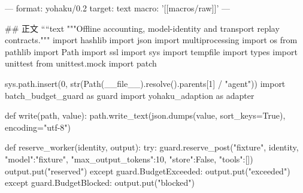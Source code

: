 ---
format: yohaku/0.2
target: text
macro: '[[macros/raw]]'
---

## 正文
````text
"""Offline accounting, model-identity and transport replay contracts."""
import hashlib
import json
import multiprocessing
import os
from pathlib import Path
import ssl
import sys
import tempfile
import types
import unittest
from unittest.mock import patch

sys.path.insert(0, str(Path(__file__).resolve().parents[1] / "agent"))
import batch_budget_guard as guard
import yohaku_adaption as adapter

def write(path, value):
    path.write_text(json.dumps(value, sort_keys=True), encoding="utf-8")

def reserve_worker(identity, output):
    try:
        guard.reserve_post("fixture", identity, {"model":"fixture", "max_output_tokens":10, "store":False, "tools":[]})
        output.put("reserved")
    except guard.BudgetExceeded:
        output.put("exceeded")
    except guard.BudgetBlocked:
        output.put("blocked")

